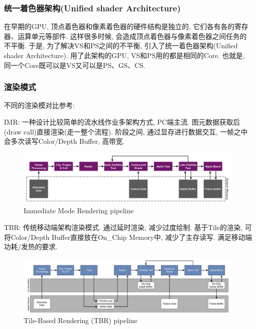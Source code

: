 \documentclass[UTF8]{ctexart}
\begin{document}
\subsubsection{统一着色器架构(Unified shader Architecture)}
在早期的GPU, 顶点着色器和像素着色器的硬件结构是独立的, 它们各有各的寄存器、运算单元等部件. 这样很多时候, 会造成顶点着色器与像素着色器之间任务的不平衡.
于是, 为了解决VS和PS之间的不平衡, 引入了统一着色器架构(Unified shader Architecture). 用了此架构的GPU, VS和PS用的都是相同的Core. 也就是, 同一个Core既可以是VS又可以是PS、GS、CS.

\subsubsection{渲染模式}

不同的渲染模对比参考\cite{render_mode_comp}:

IMR: 一种设计比较简单的流水线作业多架构方式, PC端主流. 图元数据获取后(draw call)直接渲染(走一整个流程). 阶段之间, 通过显存进行数据交互, 一帧之中会多次读写Color/Depth Buffer, 高带宽.

\begin{figure}[H]
  \includegraphics[width=15cm]{IMR-Pipeline-1.jpg}
  \centering
  \caption{Immediate Mode Rendering pipeline}
  \label{fig:imr}
\end{figure}

TBR: 传统移动端架构渲染模式. 通过延时渲染, 减少过度绘制. 基于Tile的渲染, 可将Color/Depth Buffer直接放在On\_Chip Memory中, 减少了主存读写. 满足移动端功耗/发热的要求.

\begin{figure}[H]
  \includegraphics[width=15cm]{tbr.png}
  \centering
  \caption{Tile-Based Rendering (TBR) pipeline}
  \label{fig:tbr}
\end{figure}
\end{document}
